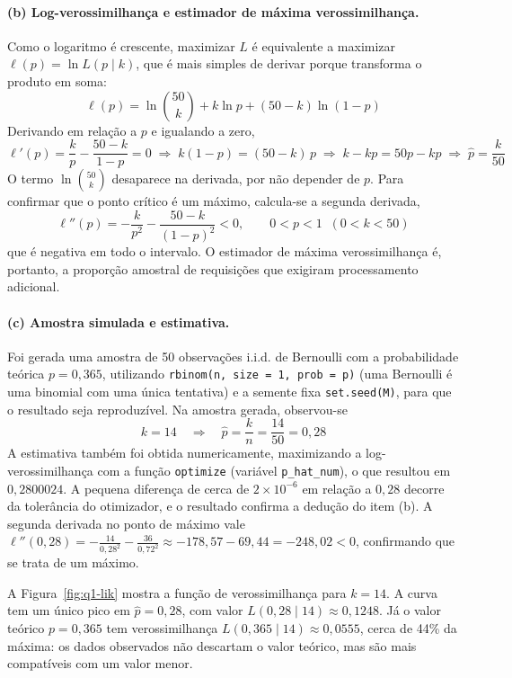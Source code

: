 \documentclass[10pt,a4paper]{article}
\begin{document}
\paragraph{(b) Log-verossimilhança e estimador de máxima verossimilhança.} Como o logaritmo é crescente, maximizar $L$ é equivalente a maximizar $\ell(p) = \ln L(p \mid k)$, que é mais simples de derivar porque transforma o produto em soma:
\[
\ell(p) = \ln\binom{50}{k} + k \ln p + (50 - k)\ln(1-p)
\]
Derivando em relação a $p$ e igualando a zero,
\[
\ell'(p) = \frac{k}{p} - \frac{50-k}{1-p} = 0 \;\Longrightarrow\; k(1-p) = (50-k)\,p \;\Longrightarrow\; k - kp = 50p - kp \;\Longrightarrow\; \boxed{\hat{p} = \frac{k}{50}}
\]
O termo $\ln\binom{50}{k}$ desaparece na derivada, por não depender de $p$. Para confirmar que o ponto crítico é um máximo, calcula-se a segunda derivada,
\[
\ell''(p) = -\frac{k}{p^{2}} - \frac{50-k}{(1-p)^{2}} < 0, \qquad 0 < p < 1 \;\; (0 < k < 50)
\]
que é negativa em todo o intervalo. O estimador de máxima verossimilhança é, portanto, a proporção amostral de requisições que exigiram processamento adicional.

\paragraph{(c) Amostra simulada e estimativa.} Foi gerada uma amostra de 50 observações i.i.d. de Bernoulli com a probabilidade teórica $p = 0{,}365$, utilizando \texttt{rbinom(n, size = 1, prob = p)} (uma Bernoulli é uma binomial com uma única tentativa) e a semente fixa \texttt{set.seed(M)}, para que o resultado seja reproduzível. Na amostra gerada, observou-se
\[
k = 14 \quad \Longrightarrow \quad \hat{p} = \frac{k}{n} = \frac{14}{50} = 0{,}28
\]
A estimativa também foi obtida numericamente, maximizando a log-verossimilhança com a função \texttt{optimize} (variável \texttt{p\_hat\_num}), o que resultou em $0{,}2800024$. A pequena diferença de cerca de $2 \times 10^{-6}$ em relação a $0{,}28$ decorre da tolerância do otimizador, e o resultado confirma a dedução do item (b). A segunda derivada no ponto de máximo vale $\ell''(0{,}28) = -\frac{14}{0{,}28^2} - \frac{36}{0{,}72^2} \approx -178{,}57 - 69{,}44 = -248{,}02 < 0$, confirmando que se trata de um máximo.

A Figura~\ref{fig:q1-lik} mostra a função de verossimilhança para $k = 14$. A curva tem um único pico em $\hat{p} = 0{,}28$, com valor $L(0{,}28 \mid 14) \approx 0{,}1248$. Já o valor teórico $p = 0{,}365$ tem verossimilhança $L(0{,}365 \mid 14) \approx 0{,}0555$, cerca de 44\% da máxima: os dados observados não descartam o valor teórico, mas são mais compatíveis com um valor menor.
\end{document}
